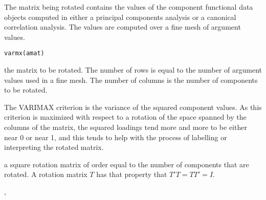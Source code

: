 \documentclass{article}
\begin{document}
\begin{Description}\relax
The matrix being rotated contains the values of the component
functional data objects computed in either a principal
components analysis or a canonical correlation analysis.
The values are computed over a fine mesh of argument values.
\end{Description}
\begin{Usage}
\begin{verbatim}
varmx(amat)
\end{verbatim}
\end{Usage}
\begin{Arguments}
\begin{ldescription}
\item[\code{amat}] the matrix to be rotated.  The number of rows is
equal to the number of argument values  used
in a fine mesh.  The number of columns is the number of
components to be rotated.

\end{ldescription}
\end{Arguments}
\begin{Details}\relax
The VARIMAX criterion is the variance of the squared component values.
As this criterion is maximized with respect to a rotation of the
space spanned by the columns of the matrix, the squared loadings
tend more and more to be either near 0 or near 1, and this tends to
help with the process of labelling or interpreting the rotated matrix.
\end{Details}
\begin{Value}
a square rotation matrix of order equal to the number
of components that are rotated.  A rotation matrix
$T$ has that property that $T'T = TT' = I$.
\end{Value}
\begin{SeeAlso}\relax
{}, 
\end{SeeAlso}
\end{document}
